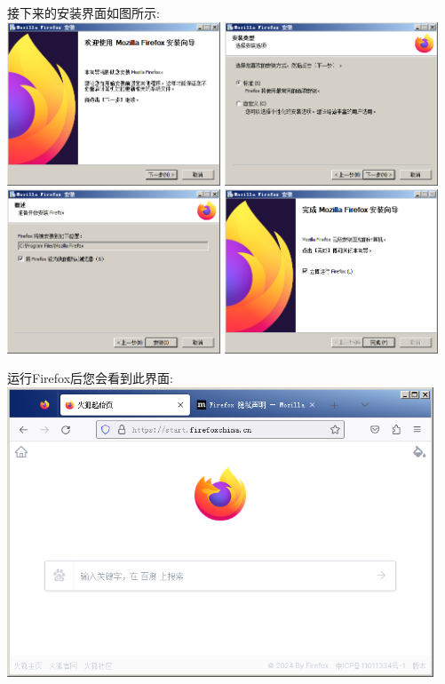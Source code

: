 接下来的安装界面如图所示: \\
\includegraphics[width=2.5in]{media/image5.png}
\includegraphics[width=2.5in]{media/image6.png} \\
\includegraphics[width=2.5in]{media/image7.png}
\includegraphics[width=2.5in]{media/image8.png}

运行Firefox后您会看到此界面: \\
\includegraphics[width=5in]{media/image9.png}

